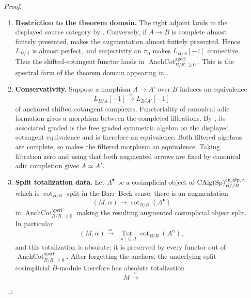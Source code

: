 \begin{proof}
\leavevmode
\begin{enumerate}[label=\textup{(\arabic*)}]
    \item \textbf{Restriction to the theorem domain.}
    The right adjoint lands in the displayed source category by
    . Conversely, if \(A\to B\) is complete
    almost finitely presented,  makes the
    augmentation almost finitely presented. Hence \(L_{B/A}\) is almost perfect,
    and surjectivity on \(\pi_0\) makes \(L_{B/A}[-1]\) connective. Thus the
    shifted-cotangent functor lands in
    \(\operatorname{AnchCot}^{\mathrm{aperf}}_{B/R,\geq0}\).
    This is the spectral form of the theorem domain appearing in
    \cite[Theorem~2.25]{BrantnerMagidsonNuiten}.
    \item \textbf{Conservativity.}
    Suppose a morphism \(A\to A'\) over \(B\) induces an equivalence
    \[
        L_{B/A}[-1]\xrightarrow{\simeq}L_{B/A'}[-1]
    \]
    of anchored shifted cotangent complexes. Functoriality of canonical adic formation gives
    a morphism between the completed filtrations. By
    , its associated graded is the free graded
    symmetric algebra on the displayed cotangent equivalence and is therefore an
    equivalence. Both filtered algebras are complete, so
     makes the filtered morphism an
    equivalence. Taking filtration zero and using that both augmented arrows are
    fixed by canonical adic completion gives \(A\simeq A'\).
    \item \textbf{Split totalization data.}
    Let \(A^\bullet\) be a cosimplicial object of
    \(\operatorname{CAlg}(\operatorname{Sp})^{\mathrm{cn},\mathrm{afp},\wedge}_{R//B}\) which is
    \(\operatorname{cot}_{B/R}\)-split in the Barr--Beck sense: there is an
    augmentation
    \[
        (M,\alpha)
        \longrightarrow
        \operatorname{cot}_{B/R}(A^\bullet)
    \]
    in \(\operatorname{AnchCot}^{\mathrm{aperf}}_{B/R,\geq0}\) making the resulting
    augmented cosimplicial object split. In particular,
    \[
        (M,\alpha)
        \xrightarrow{\simeq}
        \operatorname*{Tot}_{[n]\in\Delta}
        \operatorname{cot}_{B/R}(A^n),
    \]
    and this totalization is absolute: it is preserved by every functor out of
    \(\operatorname{AnchCot}^{\mathrm{aperf}}_{B/R,\geq0}\). After forgetting the
    anchors, the underlying split cosimplicial \(B\)-module therefore has
    absolute totalization
    \[
        M
        \xrightarrow{\simeq}
\]
\end{enumerate}
\end{proof}

